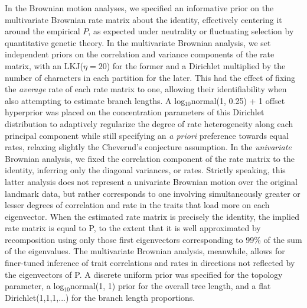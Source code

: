 In the Brownian motion analyses, we specified an informative prior on the multivariate Brownian rate matrix about the identity, effectively centering it around the empirical $P$, as expected under neutrality or fluctuating selection by quantitative genetic theory. In the multivariate Brownian analysis, we set independent priors on the correlation and variance components of the rate matrix, with an LKJ($\eta = 20$) for the former and a Dirichlet multiplied by the number of characters in each partition for the later. This had the effect of fixing the \textit{average} rate of each rate matrix to one, allowing their identifiability when also attempting to estimate branch lengths. A log$_{10}$normal(1, 0.25) + 1 offset hyperprior was placed on the concentration parameters of this Dirichlet distribution to adaptively regularize the degree of rate heterogeneity along each principal component while still specifying an \textit{a priori} preference towards equal rates, relaxing slightly the Cheverud's conjecture assumption. In the \textit{univariate} Brownian analysis, we fixed the correlation component of the rate matrix to the identity, inferring only the diagonal variances, or rates. Strictly speaking, this latter analysis does not represent a univariate Brownian motion over the original landmark data, but rather corresponds to one involving simultaneously greater or lesser degrees of correlation and rate in the traits that load more on each eigenvector. When the estimated rate matrix is precisely the identity, the implied rate matrix is equal to P, to the extent that it is well approximated by recomposition using only those first eigenvectors corresponding to 99\% of the sum of the eigenvalues. The multivariate Brownian analysis, meanwhile, allows for finer-tuned inference of trait correlations and rates in directions not reflected by the eigenvectors of P. A discrete uniform prior was specified for the topology parameter, a log$_{10}$normal(1, 1) prior for the overall tree length, and a flat Dirichlet(1,1,1,...) for the branch length proportions. 


